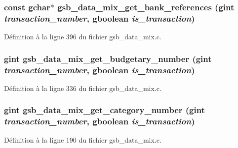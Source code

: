 \subsubsection[{gsb\_\-data\_\-mix\_\-get\_\-bank\_\-references}]{\setlength{\rightskip}{0pt plus 5cm}const gchar$\ast$ gsb\_\-data\_\-mix\_\-get\_\-bank\_\-references (gint {\em transaction\_\-number}, \/  gboolean {\em is\_\-transaction})}\label{gsb__data__mix_8c_ad691b36a183805222a9894da611728e4}


Définition à la ligne 396 du fichier gsb\_\-data\_\-mix.c.

\subsubsection[{gsb\_\-data\_\-mix\_\-get\_\-budgetary\_\-number}]{\setlength{\rightskip}{0pt plus 5cm}gint gsb\_\-data\_\-mix\_\-get\_\-budgetary\_\-number (gint {\em transaction\_\-number}, \/  gboolean {\em is\_\-transaction})}\label{gsb__data__mix_8c_a45830c30d41b2587fa29718ed7e4dd00}


Définition à la ligne 336 du fichier gsb\_\-data\_\-mix.c.

\subsubsection[{gsb\_\-data\_\-mix\_\-get\_\-category\_\-number}]{\setlength{\rightskip}{0pt plus 5cm}gint gsb\_\-data\_\-mix\_\-get\_\-category\_\-number (gint {\em transaction\_\-number}, \/  gboolean {\em is\_\-transaction})}\label{gsb__data__mix_8c_ac80ddad52ce85a6a444b717f4fa0dcd4}


Définition à la ligne 190 du fichier gsb\_\-data\_\-mix.c.

